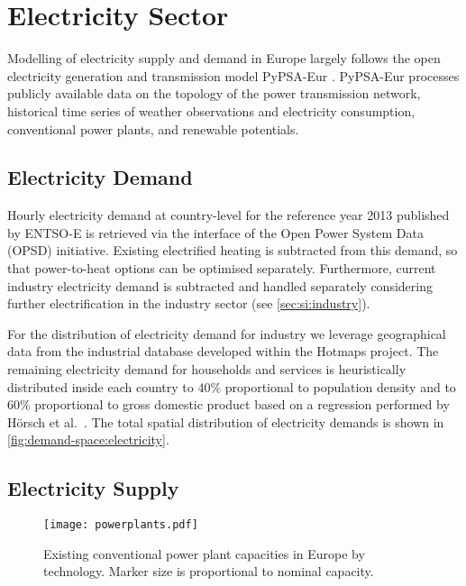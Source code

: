 \section{Electricity Sector}
\label{sec:si:electricity}

Modelling of electricity supply and demand in Europe largely follows the open
electricity generation and transmission model PyPSA-Eur
. PyPSA-Eur processes publicly available data on
the topology of the power transmission network, historical time series of
weather observations and electricity consumption, conventional power plants, and
renewable potentials.

\subsection{Electricity Demand}
\label{sec:si:electricity:demand}

Hourly electricity demand at country-level for the reference year 2013 published
by ENTSO-E is retrieved via the interface of the Open Power System Data (OPSD)
initiative. Existing electrified heating is subtracted from this
demand, so that power-to-heat options can be optimised separately. Furthermore,
current industry electricity demand is subtracted and handled separately
considering further electrification in the industry sector (see \cref{sec:si:industry}).

For the distribution of electricity demand for industry we leverage geographical
data from the industrial database developed within the Hotmaps project.
 The remaining
electricity demand for households and services is heuristically distributed
inside each country to 40\% proportional to population density and to 60\%
proportional to gross domestic product based on a regression performed by Hörsch
et al.~. The total spatial distribution of
electricity demands is shown in \cref{fig:demand-space:electricity}.

\subsection{Electricity Supply}

\begin{SCfigure}
    \caption{Existing conventional power plant capacities in Europe by technology. Marker size is proportional to nominal capacity.}
    \label{fig:powerplants}
    \texttt{[image: powerplants.pdf]}
\end{SCfigure}

